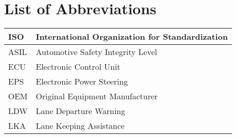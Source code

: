 \chapter{List of Abbreviations}
\label{ch:abbr}

\renewcommand{\arraystretch}{1.7}
\begin{tabular}{| L{3cm} | L{11cm} |}
\hline
ISO & International Organization for Standardization 
\\\hline
ASIL & Automotive Safety Integrity Level
\\\hline
ECU & Electronic Control Unit
\\\hline
EPS & Electronic Power Steering
\\\hline
OEM & Original Equipment Manufacturer
\\\hline
LDW & Lane Departure Warning
\\\hline
LKA & Lane Keeping Assistance
\\\hline
\end{tabular}
